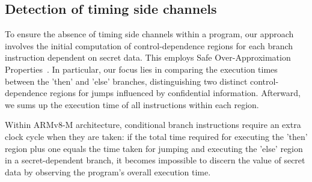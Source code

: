 \subsection{Detection of timing side channels}

To ensure the absence of timing side channels within a program, our
approach involves the initial computation of control-dependence regions for
each branch instruction dependent on secret data. This employs
Safe Over-Approximation Properties~\cite{MantelAVR}. In particular, our focus lies in comparing the
execution times between the 'then' and 'else' branches, distinguishing two
distinct control-dependence regions for jumps influenced by confidential
information.
Afterward, we sums up the execution time of all instructions within each
region.

% 
%    
% 
% 

Within ARMv8-M architecture, conditional branch instructions require an
extra clock cycle when they are taken: if the total time
required for executing the 'then' region plus one equals the time taken for
jumping and executing the 'else' region in a secret-dependent branch, it
becomes impossible to discern the value of secret data by observing the
program's overall execution time.

